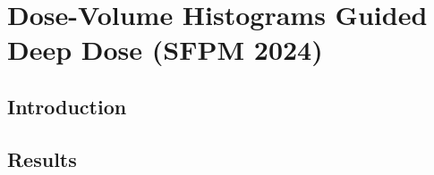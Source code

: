 \section{Dose-Volume Histograms Guided Deep Dose (SFPM 2024)}
\subsection{Introduction}

\subsection{Results}

